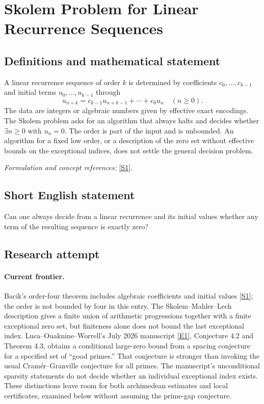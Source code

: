 \documentclass[11pt,a4paper]{article}
\newcommand{\sref}[2]{\hyperlink{source:#1:#2}{[S#2]}}
\newcommand{\eref}[2]{\hyperlink{extra:#1:#2}{[E#2]}}
\newif\ifshowcatalogue
\newcommand{\cataloguescope}[1]{\ifshowcatalogue
 \paragraph{Exact scope in the supplied catalogue.}
 \begin{quote}\small #1\end{quote}\fi}
\begin{document}
\setcounter{section}{216}
\clearpage
\section{\texorpdfstring{Skolem Problem for Linear Recurrence Sequences}{Skolem Problem for Linear Recurrence Sequences}}\label{217}
\subsection{Definitions and mathematical statement}
A linear recurrence sequence of order $k$ is determined by coefficients $c_0,\ldots,c_{k-1}$ and initial terms $u_0,\ldots,u_{k-1}$ through
\[
 u_{n+k}=c_{k-1}u_{n+k-1}+\cdots+c_0u_n\quad(n\ge0).
\]
The data are integers or algebraic numbers given by effective exact encodings. The Skolem problem asks for an algorithm that always halts and decides whether $\exists n\ge0$ with $u_n=0$. The order is part of the input and is unbounded. An algorithm for a fixed low order, or a description of the zero set without effective bounds on the exceptional indices, does not settle the general decision problem.
\par\smallskip\textit{Formulation and concept references:} \sref{217}{1}.
\cataloguescope{Decide algorithmically, given an integer (or algebraic) linear recurrence sequence, whether it has a zero term.}
\subsection{Short English statement}
Can one always decide from a linear recurrence and its initial values whether any term of the resulting sequence is exactly zero?
\subsection{Research attempt}

\paragraph{Current frontier.}
Bacik's order-four theorem includes algebraic coefficients and initial
values \sref{217}{1}; the order is not bounded by four in this entry.
The Skolem--Mahler--Lech description gives a finite union of arithmetic
progressions together with a finite exceptional zero set, but finiteness
alone does not bound the last exceptional index. Luca--Ouaknine--Worrell's
July 2026 manuscript \eref{217}{1}, Conjecture 4.2 and Theorem 4.3, obtains
a conditional large-zero bound from a spacing conjecture for a specified
set of ``good primes.'' That conjecture is stronger than invoking the
usual Cram\'er--Granville conjecture for all primes. The manuscript's
unconditional sparsity statements do not decide whether an individual
exceptional index exists. These distinctions leave room for both
archimedean estimates and local certificates, examined below without
assuming the prime-gap conjecture.
\end{document}
